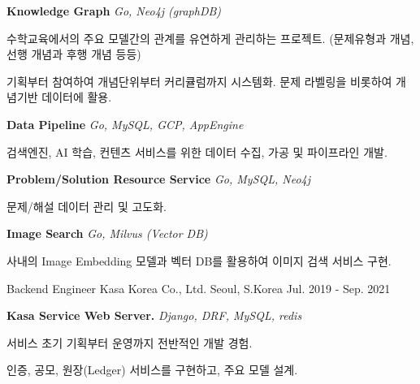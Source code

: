\begin{cventries}
\cventry
{} %
{} %
{} %
{} %
{
  \begin{cvsubentries}
    \begin{cvitems} %
      \item[] {\textbf{Knowledge Graph} \hspace{1cm} \textit{Go, Neo4j (graphDB)}}
      \item[] {수학교육에서의 주요 모델간의 관계를 유연하게 관리하는 프로젝트. (문제유형과 개념, 선행 개념과 후행 개념 등등)}
      \item {기획부터 참여하여 개념단위부터 커리큘럼까지 시스템화. 문제 라벨링을 비롯하여 개념기반 데이터에 활용.}
      \item[] 
      \item[] {\textbf{Data Pipeline} \hspace{1cm} \textit{Go, MySQL, GCP, AppEngine}}
      \item {검색엔진, AI 학습, 컨텐츠 서비스를 위한 데이터 수집, 가공 및 파이프라인 개발.}
      \item[] 
      \item[] {\textbf{Problem/Solution Resource Service} \hspace{1cm} \textit{Go, MySQL, Neo4j}}
      \item {문제/해설 데이터 관리 및 고도화.}
      \item[] 
      \item[] {\textbf{Image Search} \hspace{1cm} \textit{Go, Milvus (Vector DB)}}
      \item {사내의 Image Embedding 모델과 벡터 DB를 활용하여 이미지 검색 서비스 구현.}
      \item[]
    \end{cvitems}
  \end{cvsubentries}
}
  \cventry
    {Backend Engineer} %
    {Kasa Korea Co., Ltd.} %
    {Seoul, S.Korea} %
    {Jul. 2019 - Sep. 2021} %
    {
      \begin{cvitems} %
        \item[] {\textbf{Kasa Service Web Server.} \hspace{1cm} \textit{Django, DRF, MySQL, redis}}
        \item {서비스 초기 기획부터 운영까지 전반적인 개발 경험.}
        \item {인증, 공모, 원장(Ledger) 서비스를 구현하고, 주요 모델 설계.}
        \item[]
      \end{cvitems}
    }


\end{cventries}
